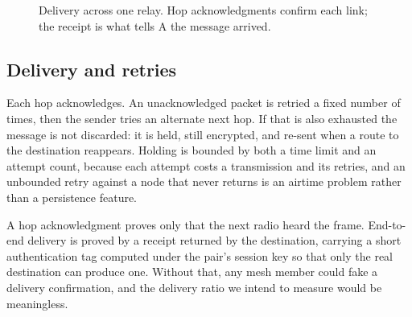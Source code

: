 \documentclass[conference]{IEEEtran}
\begin{document}
\begin{figure}[!t]
\centering
{}
\caption{Delivery across one relay. Hop acknowledgments confirm each link; the
receipt is what tells A the message arrived.}
\label{fig:route}
\end{figure}

\subsection{Delivery and retries}

Each hop acknowledges. An unacknowledged packet is retried a fixed number of
times, then the sender tries an alternate next hop. If that is also exhausted the
message is not discarded: it is held, still encrypted, and re-sent when a route
to the destination reappears. Holding is bounded by both a time limit and an
attempt count, because each attempt costs a transmission and its retries, and an
unbounded retry against a node that never returns is an airtime problem rather
than a persistence feature.

A hop acknowledgment proves only that the next radio heard the frame. End-to-end
delivery is proved by a receipt returned by the destination, carrying a short
authentication tag computed under the pair's session key so that only the real
destination can produce one. Without that, any mesh member could fake a delivery
confirmation, and the delivery ratio we intend to measure would be meaningless.
\end{document}
